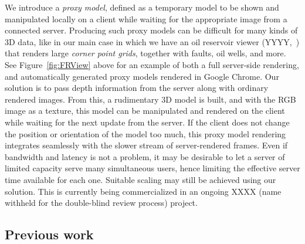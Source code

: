 We introduce a {\em proxy model}, defined as a temporary model to be shown and
manipulated locally on a client while waiting for the appropriate image from a
connected server. Producing such proxy models can be difficult for many kinds of
3D data, like in our main case in which we have an oil reservoir viewer
(YYYY,~\cite{cloudviz}) that renders large {\em corner point grids}, together
with faults, oil wells, and more. See Figure~\ref{fig:FRView} above for an
example of both a full server-side rendering, and automatically generated proxy
models rendered in Google Chrome.
%
Our solution is to pass depth information from the server along with ordinary
rendered images. From this, a rudimentary 3D model is built, and with the RGB
image as a texture, this model can be manipulated and rendered on the client
while waiting for the next update from the server. If the client does not change
the position or orientation of the model too much, this proxy model rendering
integrates seamlessly with the slower stream of server-rendered frames.
%
Even if bandwidth and latency is not a problem, it may be desirable to let a
server of limited capacity serve many simultaneous users, hence limiting the
effective server time available for each one. Suitable scaling may still be
achieved using our solution. This is currently being commercialized in an
ongoing XXXX (name withheld for the double-blind review process) project.


\subsection{Previous work}
\label{sec:prevWork}

